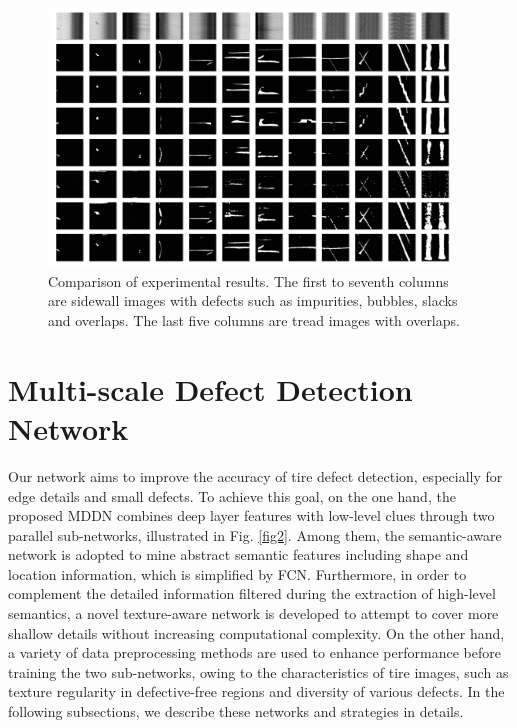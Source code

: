 \documentclass{article}
\begin{document}
\begin{figure}[t]
  \centering
  \centerline{\includegraphics[width=0.95\textwidth]{pic3.eps}}
  \caption{Comparison of experimental results. The first to seventh columns are sidewall images with defects such as impurities, bubbles, slacks and overlaps. The last five columns are tread images with overlaps.}
  \label{fig3}
\end{figure}
\section{Multi-scale Defect Detection Network}
\label{sec:format}

Our network aims to improve the accuracy of tire defect detection, especially for edge details and small defects. To achieve this goal, on the one hand, the proposed MDDN combines deep layer features with low-level clues through two parallel sub-networks, illustrated in Fig. \ref{fig2}. Among them, the semantic-aware network is adopted to mine abstract semantic features including shape and location information, which is simplified by FCN. Furthermore, in order to complement the detailed information filtered during the extraction of high-level semantics, a novel texture-aware network is developed to attempt to cover more shallow details without increasing computational complexity. On the other hand, a variety of data preprocessing methods are used to enhance performance before training the two sub-networks, owing to the characteristics of tire images, such as texture regularity  in defective-free regions and diversity of various defects. In the following subsections, we describe these networks and strategies in details.
\end{document}
